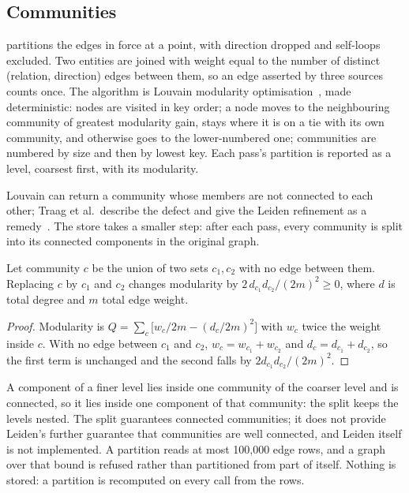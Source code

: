 \subsection{Communities}

\shipped{}  partitions the edges in force at a point, with
direction dropped and self-loops excluded. Two entities are joined with weight
equal to the number of distinct (relation, direction) edges between them, so an
edge asserted by three sources counts once. The algorithm is Louvain
modularity optimisation~\cite{blondel2008louvain,newman2004modularity}, made
deterministic: nodes are visited in key order; a node moves to the neighbouring
community of greatest modularity gain, stays where it is on a tie with its own
community, and otherwise goes to the lower-numbered one; communities are
numbered by size and then by lowest key. Each pass's partition is reported as a
level, coarsest first, with its modularity.

Louvain can return a community whose members are not connected to each other;
Traag et al.\ describe the defect and give the Leiden refinement as a
remedy~\cite{traag2019leiden}. The store takes a smaller step: after each pass,
every community is split into its connected components in the original graph.

\begin{proposition}
Let community $c$ be the union of two sets $c_1, c_2$ with no edge between them.
Replacing $c$ by $c_1$ and $c_2$ changes modularity by
$2\,d_{c_1} d_{c_2} / (2m)^2 \ge 0$, where $d$ is total degree and $m$ total
edge weight.
\end{proposition}
\begin{proof}
Modularity is $Q = \sum_c \big[ w_c / 2m - (d_c / 2m)^2 \big]$ with $w_c$ twice
the weight inside $c$. With no edge between $c_1$ and $c_2$,
$w_c = w_{c_1} + w_{c_2}$ and $d_c = d_{c_1} + d_{c_2}$, so the first term is
unchanged and the second falls by $2 d_{c_1} d_{c_2}/(2m)^2$.
\end{proof}

A component of a finer level lies inside one community of the coarser level and
is connected, so it lies inside one component of that community: the split keeps
the levels nested. The split guarantees connected communities; it does not
provide Leiden's further guarantee that communities are well connected, and
Leiden itself is not implemented. A partition reads at most 100{,}000 edge rows,
and a graph over that bound is refused rather than partitioned from part of
itself. Nothing is stored: a partition is recomputed on every call from the rows.

